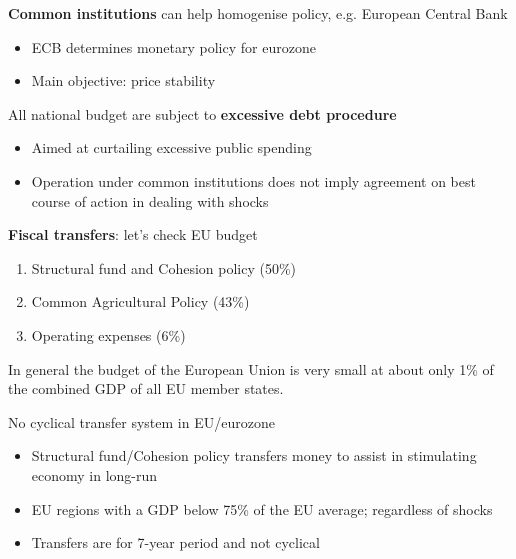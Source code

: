 \documentclass{beamer}
\begin{document}
\begin{frame}
  \textbf{Common institutions} can help homogenise policy, e.g. European Central Bank
  \begin{itemize}
    \item ECB determines monetary policy for eurozone
    \item Main objective: price stability
  \end{itemize}
  \medskip
  All national budget are subject to \textbf{excessive debt procedure}   
  \begin{itemize}
    \item Aimed at curtailing excessive public spending
    \item Operation under common institutions does not imply agreement on best course of action in dealing with shocks
  \end{itemize}
\end{frame}

\begin{frame}
  \textbf{Fiscal transfers}: let's check EU budget
  \begin{enumerate}
    \item Structural fund and Cohesion policy (50\%)
    \item Common Agricultural Policy (43\%)
    \item Operating expenses (6\%)
  \end{enumerate}
  \medskip
  In general the budget of the European Union is very small at about only 1\% of the combined GDP of all EU member states. 
\end{frame}

\begin{frame}
 No cyclical transfer system in EU/eurozone  
  \begin{itemize}
    \item Structural fund/Cohesion policy transfers money to assist in stimulating economy in long-run
    \item EU regions with a GDP below 75\% of the EU average; regardless of shocks
    \item Transfers are for 7-year period and not cyclical
  \end{itemize}
\end{frame}
\end{document}
